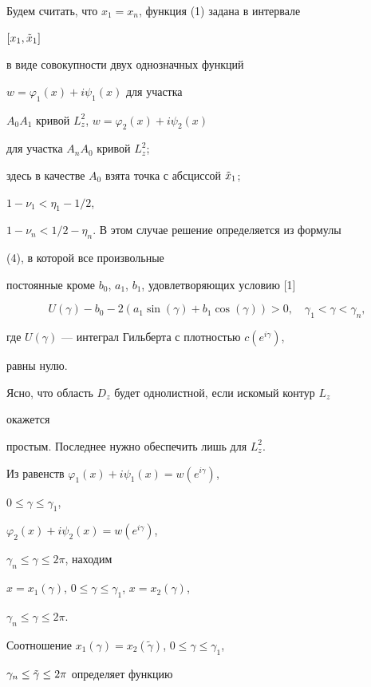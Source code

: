 Будем считать, что $x_1=x_n$, функция (1) задана в интервале


$[x_1,\Tilde x_1]$


в виде совокупности двух однозначных функций


$w=\varphi_1(x)+i\psi_1(x)$ для участка


$A_0A_1$ кривой $L_z^2$, $w=\varphi_2(x)+i\psi_2(x)$


для участка $A_nA_0$ кривой $L_z^2$;


здесь в качестве $A_0$ взята точка с абсциссой $\Tilde x_1$;


$1-\nu_1<\eta_1-1/2$,


$1-\nu_n<1/2-\eta_n$. В этом случае решение определяется из формулы


(4), в которой все произвольные


постоянные кроме $b_0$, $a_1$, $b_1$, удовлетворяющих условию [1]


\begin{equation}


U(\gamma)-b_0-2(a_1\sin(\gamma)+b_1\cos(\gamma))>0,


\quad \gamma_1<\gamma< \gamma_n,


\end{equation}


где $U(\gamma)$ --- интеграл Гильберта с плотностью $c(e^{i\gamma})$,


равны нулю.





Ясно, что область $D_z$ будет однолистной, если искомый контур $L_z$ 


окажется


простым. Последнее нужно обеспечить лишь для $L_z^2$.





Из равенств $\varphi_1(x)+i\psi_1(x)=w(e^{i\gamma})$,


$0\le\gamma\le\gamma_1$,


$\varphi_2(x)+i\psi_2(x)=w(e^{i\gamma})$,


$\gamma_n\le\gamma\le 2\pi$, находим


$x=x_1(\gamma)$, $0\le\gamma\le\gamma_1$, $x=x_2(\gamma)$,


$\gamma_n\le\gamma\le 2\pi$.


Соотношение $x_1(\gamma)=x_2(\tilde\gamma)$, $0\le\gamma\le\gamma_1$,


$\gamma_n\le\Tilde\gamma\le 2\pi$ определяет функцию


